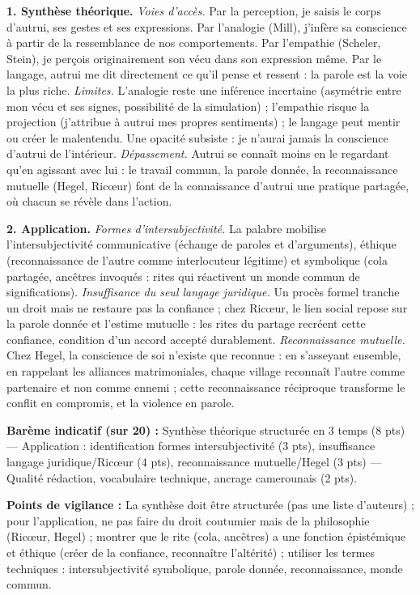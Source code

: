 \documentclass[11pt]{article}
\begin{document}
\begin{corrige}
\textbf{1. Synthèse théorique.} \emph{Voies d'accès.} Par la perception, je saisis le corps d'autrui, ses gestes et ses expressions. Par l'analogie (Mill), j'infère sa conscience à partir de la ressemblance de nos comportements. Par l'empathie (Scheler, Stein), je perçois originairement son vécu dans son expression même. Par le langage, autrui me dit directement ce qu'il pense et ressent : la parole est la voie la plus riche. \emph{Limites.} L'analogie reste une inférence incertaine (asymétrie entre mon vécu et ses signes, possibilité de la simulation) ; l'empathie risque la projection (j'attribue à autrui mes propres sentiments) ; le langage peut mentir ou créer le malentendu. Une opacité subsiste : je n'aurai jamais la conscience d'autrui de l'intérieur. \emph{Dépassement.} Autrui se connaît moins en le regardant qu'en agissant avec lui : le travail commun, la parole donnée, la reconnaissance mutuelle (Hegel, Ricœur) font de la connaissance d'autrui une pratique partagée, où chacun se révèle dans l'action.

\textbf{2. Application.} \emph{Formes d'intersubjectivité.} La palabre mobilise l'intersubjectivité communicative (échange de paroles et d'arguments), éthique (reconnaissance de l'autre comme interlocuteur légitime) et symbolique (cola partagée, ancêtres invoqués : rites qui réactivent un monde commun de significations). \emph{Insuffisance du seul langage juridique.} Un procès formel tranche un droit mais ne restaure pas la confiance ; chez Ricœur, le lien social repose sur la parole donnée et l'estime mutuelle : les rites du partage recréent cette confiance, condition d'un accord accepté durablement. \emph{Reconnaissance mutuelle.} Chez Hegel, la conscience de soi n'existe que reconnue : en s'asseyant ensemble, en rappelant les alliances matrimoniales, chaque village reconnaît l'autre comme partenaire et non comme ennemi ; cette reconnaissance réciproque transforme le conflit en compromis, et la violence en parole.

\textbf{Barème indicatif (sur 20) :} Synthèse théorique structurée en 3 temps (8 pts) — Application : identification formes intersubjectivité (3 pts), insuffisance langage juridique/Ricœur (4 pts), reconnaissance mutuelle/Hegel (3 pts) — Qualité rédaction, vocabulaire technique, ancrage camerounais (2 pts).

\textbf{Points de vigilance :} La synthèse doit être structurée (pas une liste d'auteurs) ; pour l'application, ne pas faire du droit coutumier mais de la philosophie (Ricœur, Hegel) ; montrer que le rite (cola, ancêtres) a une fonction épistémique et éthique (créer de la confiance, reconnaître l'altérité) ; utiliser les termes techniques : intersubjectivité symbolique, parole donnée, reconnaissance, monde commun.
\end{corrige}
\end{document}
